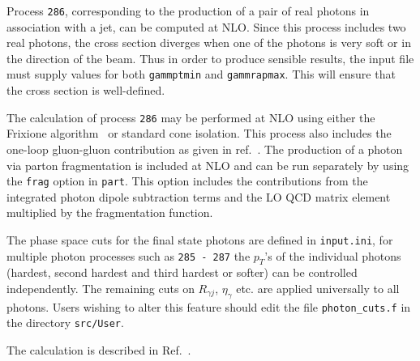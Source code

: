 
Process {\tt 286}, corresponding to the production of a pair of real photons in association with a jet, can be computed at NLO.   
Since this process includes two real photons, the cross section diverges
when one of the photons is very soft or in the direction of the beam.
Thus in order to produce sensible results, the input file must supply values for both
{\tt gammptmin} and {\tt gammrapmax}. This will ensure that
the cross section is well-defined.

The calculation of process {\tt 286} may be performed at NLO using either the
Frixione algorithm~\cite{Frixione:1998jh} or standard cone isolation.  This process also includes
the one-loop gluon-gluon contribution as given in
ref.~\cite{Bern:2002jx}.  The production of a photon via parton fragmentation is included at NLO and
can be run separately by using the {\tt frag} option in {\tt part}. This option includes the contributions from the
integrated
photon dipole subtraction terms and the LO QCD matrix element multiplied by the fragmentation function.

The phase space cuts for the final state photons are defined in {\tt{input.ini}}, for multiple photon processes such
as {\tt 285 - 287} the $p_T$'s of the individual photons (hardest, second hardest and third hardest or softer) can be
controlled independently.
The remaining cuts on $R_{\gamma j}$, $\eta_{\gamma}$ etc. are applied universally to all photons. Users wishing to
alter
this feature should edit the file {\tt{photon\_cuts.f}} in the directory {\tt{src/User}}.


The calculation is described in Ref.~\cite{Campbell:2014yka}.
